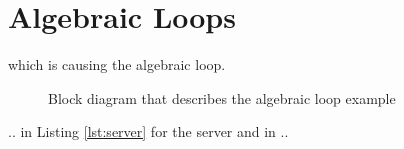 \chapter{Algebraic Loops}
\label{chp:algebraicLoop}

 which is causing the algebraic loop.
\begin{figure}[!htb]
    \def\svgwidth{0.8\textwidth}
    
    \caption{Block diagram that describes the algebraic loop example}
    \label{fig:blockDiagramAlgLoop}
\end{figure}

.. in Listing \ref{lst:server} for the server and in ..

